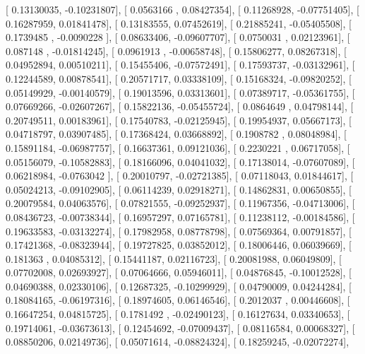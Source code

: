 \documentclass{article}
\begin{document}
       [ 0.13130035, -0.10231807],
       [ 0.0563166 ,  0.08427354],
       [ 0.11268928, -0.07751405],
       [ 0.16287959,  0.01841478],
       [ 0.13183555,  0.07452619],
       [ 0.21885241, -0.05405508],
       [ 0.1739485 , -0.0090228 ],
       [ 0.08633406, -0.09607707],
       [ 0.0750031 ,  0.02123961],
       [ 0.087148  , -0.01814245],
       [ 0.0961913 , -0.00658748],
       [ 0.15806277,  0.08267318],
       [ 0.04952894,  0.00510211],
       [ 0.15455406, -0.07572491],
       [ 0.17593737, -0.03132961],
       [ 0.12244589,  0.00878541],
       [ 0.20571717,  0.03338109],
       [ 0.15168324, -0.09820252],
       [ 0.05149929, -0.00140579],
       [ 0.19013596,  0.03313601],
       [ 0.07389717, -0.05361755],
       [ 0.07669266, -0.02607267],
       [ 0.15822136, -0.05455724],
       [ 0.0864649 ,  0.04798144],
       [ 0.20749511,  0.00183961],
       [ 0.17540783, -0.02125945],
       [ 0.19954937,  0.05667173],
       [ 0.04718797,  0.03907485],
       [ 0.17368424,  0.03668892],
       [ 0.1908782 ,  0.08048984],
       [ 0.15891184, -0.06987757],
       [ 0.16637361,  0.09121036],
       [ 0.2230221 ,  0.06717058],
       [ 0.05156079, -0.10582883],
       [ 0.18166096,  0.04041032],
       [ 0.17138014, -0.07607089],
       [ 0.06218984, -0.0763042 ],
       [ 0.20010797, -0.02721385],
       [ 0.07118043,  0.01844617],
       [ 0.05024213, -0.09102905],
       [ 0.06114239,  0.02918271],
       [ 0.14862831,  0.00650855],
       [ 0.20079584,  0.04063576],
       [ 0.07821555, -0.09252937],
       [ 0.11967356, -0.04713006],
       [ 0.08436723, -0.00738344],
       [ 0.16957297,  0.07165781],
       [ 0.11238112, -0.00184586],
       [ 0.19633583, -0.03132274],
       [ 0.17982958,  0.08778798],
       [ 0.07569364,  0.00791857],
       [ 0.17421368, -0.08323944],
       [ 0.19727825,  0.03852012],
       [ 0.18006446,  0.06039669],
       [ 0.181363  ,  0.04085312],
       [ 0.15441187,  0.02116723],
       [ 0.20081988,  0.06049809],
       [ 0.07702008,  0.02693927],
       [ 0.07064666,  0.05946011],
       [ 0.04876845, -0.10012528],
       [ 0.04690388,  0.02330106],
       [ 0.12687325, -0.10299929],
       [ 0.04790009,  0.04244284],
       [ 0.18084165, -0.06197316],
       [ 0.18974605,  0.06146546],
       [ 0.2012037 ,  0.00446608],
       [ 0.16647254,  0.04815725],
       [ 0.1781492 , -0.02490123],
       [ 0.16127634,  0.03340653],
       [ 0.19714061, -0.03673613],
       [ 0.12454692, -0.07009437],
       [ 0.08116584,  0.00068327],
       [ 0.08850206,  0.02149736],
       [ 0.05071614, -0.08824324],
       [ 0.18259245, -0.02072274],
\end{document}
